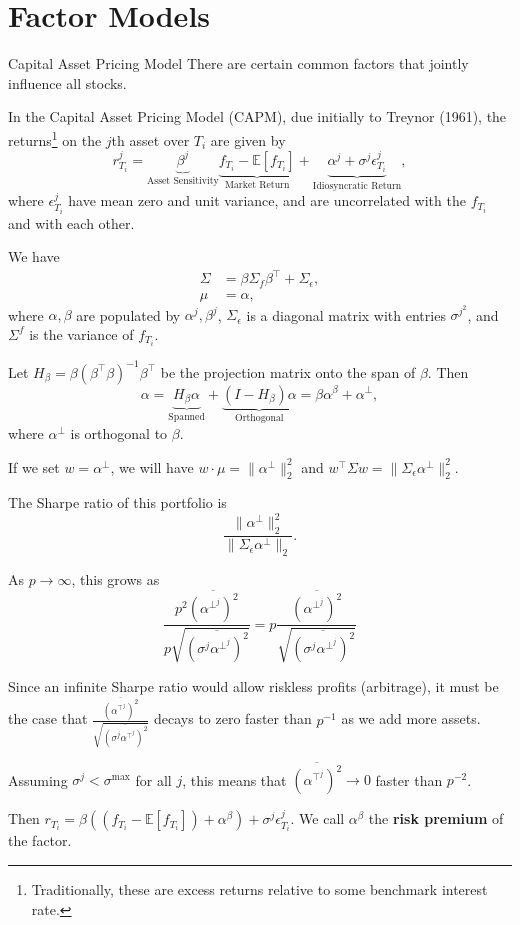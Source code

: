 \documentclass{beamer}
\begin{document}
\section{Factor Models}
\begin{frame}{Capital Asset Pricing Model}
	There are certain common factors that jointly influence all stocks.

	In the Capital Asset Pricing Model (CAPM), due initially to Treynor (1961), the returns\footnote{Traditionally, these are excess returns relative to some benchmark interest rate.} on the $j$th asset over $T_i$ are given by
	$$r_{T_i}^j = \underbrace{\beta^j}_{\textrm{Asset Sensitivity}} \underbrace{f_{T_i}-\mathbb{E}[f_{T_i}]}_{\textrm{Market Return}} + \underbrace{\alpha^j + \sigma^j\epsilon_{T_i}^j}_{\textrm{Idiosyncratic Return}},$$ 
	where $\epsilon_{T_i}^j$ have mean zero and unit variance, and are uncorrelated with the $f_{T_i}$ and with each other.

	We have
	\begin{align*}
		\Sigma	&= \beta \Sigma_f \beta^\top + \Sigma_\epsilon,
	\\	\mu	&= \alpha,
	\end{align*}
	where $\alpha,\beta$ are populated by $\alpha^j,\beta^j$, $\Sigma_\epsilon$ is a diagonal matrix with entries $\sigma^j^2$, and $\Sigma^f$ is the variance of $f_{T_i}$.

	Let $H_\beta=\beta (\beta^\top \beta)^{-1}\beta^\top$ be the projection matrix onto the span of $\beta$. Then
	$$\alpha = \underbrace{H_\beta\alpha}_{\textrm{Spanned}} + \underbrace{(I-H_\beta) \alpha}_{\textrm{Orthogonal}} = \beta \alpha^\beta + \alpha^\bot,$$
	where $\alpha^\bot$ is orthogonal to $\beta$.

	If we set $w = \alpha^\bot$, we will have $w\cdot\mu = \|\alpha^\bot\|_2^2$ and $w^\top\Sigma w = \|\Sigma_\epsilon \alpha^\bot\|_2^2$.

	The Sharpe ratio of this portfolio is
	$$\frac{\|\alpha^\bot\|_2^2}{\|\Sigma_\epsilon\alpha^\bot\|_2}.$$

	As $p\to\infty$, this grows as
	$$\frac{p^2 \overline{(\alpha^\bot^j)^2}}{p \sqrt{\overline{(\sigma^j \alpha^\bot^j)^2}}} = p \frac{\overline{(\alpha^\bot^j)^2}}{\sqrt{\overline{(\sigma^j \alpha^\bot^j)^2}}} $$

	Since an infinite Sharpe ratio would allow riskless profits (arbitrage), it must be the case that $\frac{\overline{(\alpha^\top^j)^2}}{\sqrt{\overline{(\sigma^j\alpha^\top^j)^2}}}$ decays to zero faster than $p^{-1}$ as we add more assets.

	Assuming $\sigma^j<\sigma^{\max}$ for all $j$, this means that $\overline{(\alpha^\top^j)^2}\to 0$ faster than $p^{-2}$.

	Then $r_{T_i} = \beta ((f_{T_i}-\mathbb{E}[f_{T_i}]) + \alpha^\beta) + \sigma^j\epsilon_{T_i}^j$. We call $\alpha^\beta$ the \textbf{risk premium} of the factor.

\end{frame}
\end{document}

